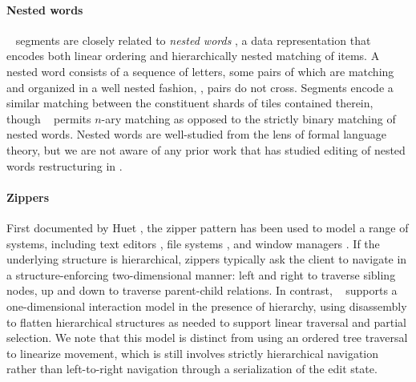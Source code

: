 

\paragraph{Nested words}
\ty~ segments are closely related to \emph{nested words}
\cite{nested-words},
a data representation that encodes both linear
ordering and hierarchically nested matching
of items.
A nested word consists of a sequence of letters,
some pairs of which are matching and organized
in a well nested fashion, \ie, pairs do not cross.
Segments encode a similar matching between the
constituent shards of tiles contained therein,
though \ty~ permits $n$-ary matching as opposed
to the strictly binary matching of nested words.
Nested words are well-studied from the lens of
formal language theory, but we are not aware of
any prior work that has studied editing of nested words
\ala restructuring in \tylr.

\paragraph{Zippers}
First documented by Huet
\cite{zipper}, the zipper pattern has been used to model a range of systems,
including text editors \cite{lazy-functional-incremental-parsing},
file systems \cite{zipper-fs}, and window managers \cite{window-manager}.
If the underlying structure is hierarchical,
zippers typically ask the client to navigate
in a structure-enforcing two-dimensional manner: left and right to traverse
sibling nodes, up and down to traverse parent-child relations.
In contrast, \ty~ supports a one-dimensional interaction model
in the presence of hierarchy, using disassembly to flatten
hierarchical structures as needed to support linear traversal
and partial selection.
We note that this model is distinct from using an ordered tree
traversal to linearize movement, which is still involves
strictly hierarchical navigation rather than
left-to-right navigation through a serialization of the edit state.

